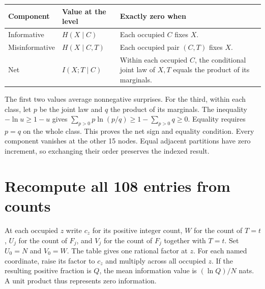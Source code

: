 {\def\LTcaptype{none} %
\begin{longtable}[]{@{}
  >{\raggedright\arraybackslash}p{}
  >{\raggedright\arraybackslash}p{}
  >{\raggedright\arraybackslash}p{}@{}}
\toprule\noalign{}
\begin{minipage}[b]{\linewidth}\raggedright
Component
\end{minipage} & \begin{minipage}[b]{\linewidth}\raggedright
Value at the level
\end{minipage} & \begin{minipage}[b]{\linewidth}\raggedright
Exactly zero when
\end{minipage} \\
\midrule\noalign{}
\endhead
\bottomrule\noalign{}
\endlastfoot
Informative & \(H(X\mid C)\) & Each occupied \(C\) fixes \(X\). \\
Misinformative & \(H(X\mid C,T)\) & Each occupied pair \((C,T)\) fixes \(X\). \\
Net & \(I(X;T\mid C)\) & Within each occupied \(C\), the conditional joint law of \(X,T\) equals the product of its marginals. \\
\end{longtable}
}

The first two values average nonnegative surprises. For the third, within each class, let \(p\) be the joint law and \(q\) the product of its marginals. The inequality \(-\ln u\ge 1-u\) gives \(\sum_{p>0}p\ln(p/q)\ge1-\sum_{p>0}q\ge0\). Equality requires \(p=q\) on the whole class. This proves the net sign and equality condition. Every component vanishes at the other 15 nodes. Equal adjacent partitions have zero increment, so exchanging their order preserves the indexed result.

\clearpage

\section{Recompute all 108 entries from counts}\label{recompute-all-108-entries-from-counts}

At each occupied \(z\) write \(c_z\) for its positive integer count, \(W\) for the count of \(T=t\), \(U_j\) for the count of \(F_j\), and \(V_j\) for the count of \(F_j\) together with \(T=t\). Set \(U_0=N\) and \(V_0=W\). The table gives one rational factor at \(z\). For each named coordinate, raise its factor to \(c_z\) and multiply across all occupied \(z\). If the resulting positive fraction is \(Q\), the mean information value is \((\ln Q)/N\) nats. A unit product thus represents zero information.

